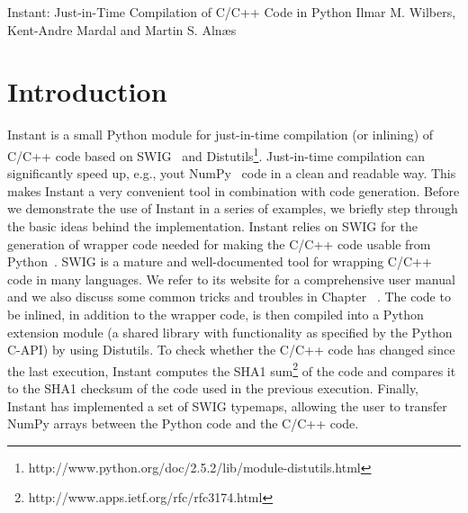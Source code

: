 

              {Instant: Just-in-Time Compilation of C/C++ Code in Python}
              {Ilmar M. Wilbers, Kent-Andre Mardal and Martin S. Aln{\ae}s}

%



\section{Introduction}

Instant is a small Python module for just-in-time compilation (or inlining) of
C/C++ code based on SWIG~\cite{SWIG} and
Distutils\footnote{http://www.python.org/doc/2.5.2/lib/module-distutils.html}. 
Just-in-time compilation can significantly speed up, e.g., yout NumPy~\cite{NumPy} code in a clean and
readable way. This makes Instant a very convenient tool in combination with code
generation. Before we demonstrate the use of Instant in a series of examples,
we briefly step through the basic ideas behind the implementation.
Instant relies on SWIG for the generation of wrapper code needed for making the
C/C++ code usable from Python~\cite{Python}. SWIG is a mature and well-documented tool
for wrapping C/C++ code in many languages. We refer to its website for a comprehensive 
user manual and we also discuss some common tricks and troubles in Chapter ~\cite{mixedlanguage}. 
The code to be inlined, in addition to the
wrapper code, is then compiled into a Python extension module (a shared library
with functionality as specified by the Python C-API) by using
Distutils. To check whether the C/C++ code has changed since the last
execution, Instant computes the SHA1
sum\footnote{http://www.apps.ietf.org/rfc/rfc3174.html} of the code and compares it to
the SHA1 checksum of the code used in the previous execution. Finally, Instant has
implemented a set of SWIG typemaps, allowing the user to
transfer NumPy arrays between the Python code and the C/C++ code.

